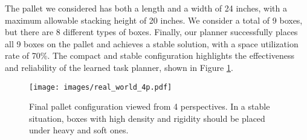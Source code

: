 The pallet we considered has both a length and a width of 24 inches, with a maximum allowable stacking height of 20 inches. We consider a total of 9 boxes, but there are 8 different types of boxes. Finally, our planner successfully places all 9 boxes on the pallet and achieves a stable solution, with a space utilization rate of 70\%.
The compact and stable configuration highlights the effectiveness and reliability of the learned task planner, shown in Figure \ref{fig:real_world_4p}.
\begin{figure}[h]
    \centering
    \texttt{[image: images/real\_world\_4p.pdf]}
    \caption{Final pallet configuration viewed from 4 perspectives. In a stable situation, boxes with high density and rigidity should be placed under heavy and soft ones.}
    \vspace{-6pt}
    \label{fig:real_world_4p}
\end{figure}
